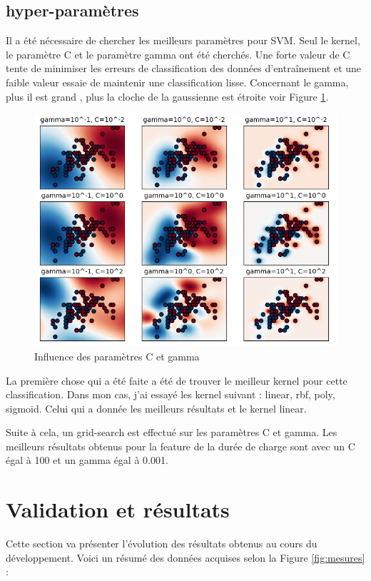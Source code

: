 \subsection{hyper-paramètres}
Il a été nécessaire de chercher les meilleurs paramètres pour SVM. Seul le kernel, le paramètre C et le paramètre gamma ont été cherchés. Une forte valeur de C tente de minimiser les erreurs de classification des données d'entraînement et une faible valeur essaie de maintenir une classification lisse. Concernant le gamma, plus il est grand , plus la cloche de la gaussienne est étroite voir Figure \ref{fig:c_gamma}. 

\begin{figure}[htp]
	\begin{center}
		\includegraphics[scale=0.7]{figures/c_gamma_param.png}
		\caption{Influence des paramètres C et gamma}
		\label{fig:c_gamma} %
	\end{center}
\end{figure}

La première chose qui a été faite  a été de trouver le meilleur kernel pour cette classification. Dans mon cas, j’ai essayé les kernel suivant : linear, rbf, poly, sigmoid. Celui qui a donnée les meilleurs résultats et le kernel linear.

Suite à cela, un grid-search est effectué sur les paramètres C et gamma. Les meilleurs résultats obtenus pour la feature de la durée de charge sont avec un C égal à 100 et un gamma égal à 0.001. 

\section{Validation et résultats}
Cette section va présenter l'évolution des résultats obtenus au cours du développement. Voici un résumé des données acquises selon la Figure \ref{fig:mesures} : 


